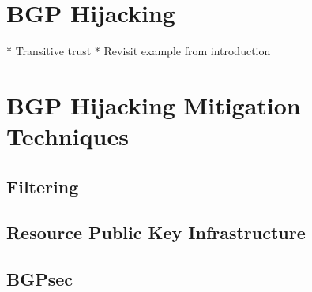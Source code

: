 \documentclass[conference]{IEEEtran}
\begin{document}
\section{BGP Hijacking}
 * Transitive trust
 * Revisit example from introduction

\section{BGP Hijacking Mitigation Techniques}

\subsection{Filtering}

\subsection{Resource Public Key Infrastructure}

\subsection{BGPsec}
\end{document}

